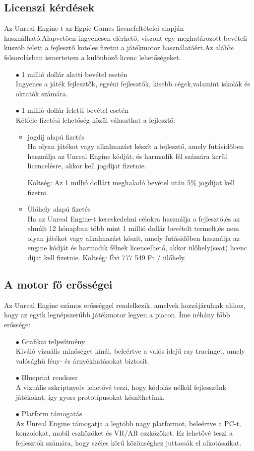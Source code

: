 \documentclass[
]{thesis-ekf}
\theoremstyle{definition}
\theoremstyle{remark}
\begin{document}
\subsection{Licenszi kérdések}
Az Unreal Engine-t az Egpic Games licencfeltételei alapján használható.Alapvetően ingyenesen elérhető, viszont egy meghatározott bevételi küszöb felett a fejlesztő köteles fizetni a játékmotor használatáért.Az alábbi felsorolásban ismertetem a különböző licenc lehetőségeket.\cite{UnrealLicences}
\begin{itemize}
	\item[$\bullet$] 1 millió dollár alatti bevétel esetén \\ Ingyenes a játék fejlesztők, egyéni fejlesztők, kisebb cégek,valamint iskolák és oktatók számára.
	\item[$\bullet$]1 millió dollár feletti bevétel esetén \\  Kétféle fizetési lehetőség közül választhat a fejlesztő:
	\begin{itemize}
		\item jogdíj alapú fizetés \\Ha olyan játékot vagy alkalmazást készít a fejlesztő, amely futásidőben használja az Unreal Engine kódját, és harmadik fél számára kerül licencelésre, akkor kell jogdíjat fizetnie.
		
		Költség: Az 1 millió dollárt meghaladó bevétel után 5\% jogdíjat kell fizetni.
		\item Ülőhely alapú fizetés \\ Ha az Unreal Engine-t kereskedelmi célokra használja a fejlesztő,és az elmúlt 12 hónapban több mint 1 millió dollár bevételt termelt,és nem olyan játékot vagy alkalmazást készít, amely futásidőben használja az engine kódját és harmadik félnek licencelhető, akkor ülőhely(seat) licenc díjat kell fizetnie.
		Költség: Évi 777 549 Ft / ülőhely.
	\end{itemize}
\end{itemize}
\subsection{A motor fő erősségei}
Az Unreal Engine számos erősséggel rendelkezik, amelyek hozzájárulnak ahhoz, hogy az egyik legnépszerűbb játékmotor legyen a piacon. Íme néhány főbb erőssége:
\begin{itemize}
	\item[$\bullet$] Grafikai teljesítmény \\Kiváló vizuális minőséget kínál, beleértve a valós idejű ray tracinget, amely valósághű fény- és árnyékhatásokat biztosít.
	\item[$\bullet$] Blueprint rendszer \\ A vizuális szkriptnyelv lehetővé teszi, hogy kódolás nélkül fejlesszünk játékokat, így gyors prototípusokat készíthetünk.
	\item[$\bullet$] Platform támogatás \\Az Unreal Engine támogatja a legtöbb nagy platformot, beleértve a PC-t, konzolokat, mobil eszközöket és VR/AR eszközöket. Ez lehetővé teszi a fejlesztők számára, hogy széles körű közönséghez juttassák el alkotásaikat.\cite{UnrealStrengths}
\end{itemize}
\end{document}
